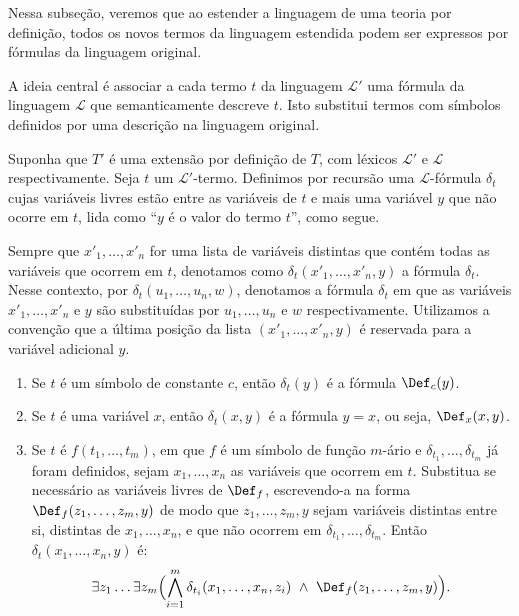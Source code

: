 Nessa subseção, veremos que ao estender a linguagem de uma teoria por definição, todos os novos termos da linguagem estendida podem ser expressos por fórmulas da linguagem original.

A ideia central é associar a cada termo $t$ da linguagem $\mathcal L'$ uma fórmula da linguagem $\mathcal L$ que semanticamente descreve $t$.
Isto substitui termos com símbolos definidos por uma descrição na linguagem original.

\begin{metadefinition}\label{mdef:formulaDoValorDeUmTermo}
    Suponha que $T'$ é uma extensão por definição de $T$, com léxicos $\mathcal L'$ e $\mathcal L$ respectivamente.
    Seja $t$ um $\mathcal L'$-termo.
    Definimos por recursão uma $\mathcal L$-fórmula $\delta_t$ cujas variáveis livres estão entre as variáveis de $t$ e mais uma variável $y$ que não ocorre em $t$, lida como
    ``$y$ é o valor do termo $t$'', como segue.

    Sempre que $x'_1, \dots, x'_n$ for uma lista de variáveis distintas que contém todas as variáveis que ocorrem em $t$, denotamos como $\delta_t(x'_1,\ldots,x'_n,y)$ a fórmula $\delta_t$.
    Nesse contexto, por $\delta_t(u_1, \dots, u_n, w)$, denotamos a fórmula $\delta_t$ em que as variáveis $x'_1, \dots, x'_n$ e $y$ são substituídas por $u_1, \dots, u_n$ e $w$ respectivamente.
    Utilizamos a convenção que a última posição da lista $(x'_1, \dots, x'_n, y)$ é reservada para a variável adicional $y$.

    \begin{enumerate}[label=(\roman*)]
        \item Se $t$ é um símbolo de constante $c$, então $\delta_t(y)$ é a fórmula $\Def_c(y)$.
        \item Se $t$ é uma variável $x$, então $\delta_t(x,y)$ é a fórmula $y=x$, ou seja, $\Def_x(x,y)$.
        \item Se $t$ é $f(t_1,\ldots,t_m)$, em que $f$ é um símbolo de função $m$-ário e $\delta_{t_1}, \dots, \delta_{t_m}$ já foram definidos, sejam $x_1, \dots, x_n$ as variáveis que ocorrem em $t$.
        Substitua se necessário as variáveis livres de $\Def_f$, escrevendo-a na forma $\Def_f(z_1,\ldots,z_m,y)$ de modo que $z_1, \dots, z_m, y$ sejam variáveis distintas entre si, distintas de $x_1, \dots, x_n$, e que não ocorrem em $\delta_{t_1}, \dots, \delta_{t_m}$.
        Então $\delta_t(x_1, \dots, x_n,y)$ é:
        \[
            \exists z_1\ldots \exists z_m\Bigl(
            \bigwedge_{i=1}^m \delta_{t_i}(x_1, \dots, x_n,z_i)\ \wedge\ \Def_f(z_1,\ldots,z_m,y)\Bigr).
        \]
    \end{enumerate}
\end{metadefinition}

